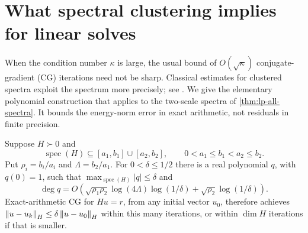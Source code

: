 \section{What spectral clustering implies for linear solves}
\label{sec:clustered-solves}

When the condition number $\kappa$ is large, the usual bound of
$O(\sqrt\kappa)$ conjugate-gradient (CG) iterations need not be sharp.
Classical estimates for clustered spectra exploit the spectrum more
precisely; see \citet{axelsson1994}. We give the elementary
polynomial construction that applies to the two-scale spectra of
\cref{thm:lp-all-spectra}. It
bounds the energy-norm error in exact arithmetic, not residuals in
finite precision.

\begin{proposition}
\label{prop:clustered-cg}
Suppose $H\succ0$ and
\[
 \operatorname{spec}(H)\subseteq[a_1,b_1]\cup[a_2,b_2],\qquad
 0<a_1\leq b_1<a_2\leq b_2.
\]
Put $\rho_i=b_i/a_i$ and $\Lambda=b_2/a_1$. For
$0<\delta\leq1/2$ there is a real polynomial $q$, with $q(0)=1$,
such that $\max_{\operatorname{spec}(H)}|q|\leq\delta$ and
\begin{equation}
 \deg q=O\left(
 \sqrt{\rho_1\rho_2}\log(4\Lambda)\log(1/\delta)
 +\sqrt{\rho_2}\log(1/\delta)\right).
 \label{eq:clustered-cg-degree}
\end{equation}
Exact-arithmetic CG for $Hu=r$, from any initial vector $u_0$,
therefore achieves
$\left\lVert u-u_k\right\rVert_H\leq\delta\left\lVert u-u_0\right\rVert_H$ within this many
iterations, or within $\dim H$ iterations if that is smaller.
\end{proposition}

